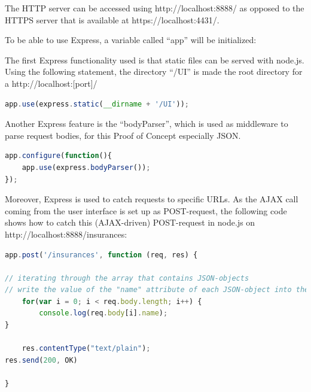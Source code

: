 



The HTTP server can be accessed using http://localhost:8888/ as opposed to the HTTPS server that is available at https://localhost:4431/.

To be able to use Express, a variable called “app” will be initialized:





The first Express functionality used is that static files can be served with node.js. Using the following statement, the directory “/UI” is made the root directory for a http://localhost:[port]/
\begin{lstlisting}[language=javascript,caption={Serving static assets with Express}]
app.use(express.static(__dirname + '/UI'));
\end{lstlisting}
Another Express feature is the “bodyParser”, which is used as middleware to parse request bodies, for this Proof of Concept especially JSON.

\begin{lstlisting}[language=javascript,caption={Using the $bodyParser$}]
app.configure(function(){
    app.use(express.bodyParser());
});
\end{lstlisting}

Moreover, Express is used to catch requests to specific URLs. As the AJAX call coming from the user interface is set up as POST-request, the following code shows how to catch this (AJAX-driven) POST-request in node.js on http://localhost:8888/insurances:

\begin{lstlisting}[language=javascript,caption={Handling an HTTP POST request with Node.js}]
app.post('/insurances', function (req, res) {

// iterating through the array that contains JSON-objects
// write the value of the "name" attribute of each JSON-object into the console
    for(var i = 0; i < req.body.length; i++) {
        console.log(req.body[i].name);
}

    res.contentType("text/plain");
res.send(200, OK)

}
\end{lstlisting}


